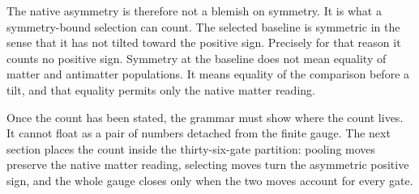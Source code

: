 The native asymmetry is therefore not a blemish on symmetry. It is what a
symmetry-bound selection can count. The selected baseline is symmetric in
the sense that it has not tilted toward the positive sign. Precisely for
that reason it counts no positive sign. Symmetry at the baseline does not
mean equality of matter and antimatter populations. It means equality of the
comparison before a tilt, and that equality permits only the native matter
reading.

Once the count has been stated, the grammar must show where the count lives.
It cannot float as a pair of numbers detached from the finite gauge. The
next section places the count inside the thirty-six-gate partition: pooling
moves preserve the native matter reading, selecting moves turn the
asymmetric positive sign, and the whole gauge closes only when the two moves
account for every gate.

